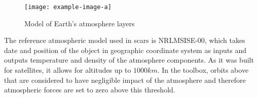 
        \begin{figure}[H]
            \centering
            \texttt{[image: example-image-a]}
            \caption{Model of Earth's atmosphere layers}
            \label{fig:atmosphere}
        \end{figure}

        The reference atmospheric model used in \ac{scars} is NRLMSISE-00, which takes date and position of the object in geographic coordinate system as inputs and outputs temperature and density of the atmosphere components. As it was built for satellites, it allows for altitudes up to $1000km$. In the toolbox, orbits above that are considered to have negligible impact of the atmosphere and therefore atmospheric forces are set to zero above this threshold.
